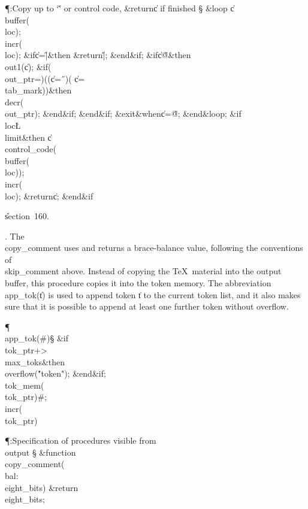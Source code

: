 \Y\P\?\4:Copy up to `\v' or control code, \?\&{return}\?\8\|c if finished%
\X\S\?\6
\1\&{loop}\6
\|c\?\K\?\\{buffer}\?\1(\?\\{loc}\?\2)\?;\5
\\{incr}\?\1(\?\\{loc}\?\2)\?;\6
\&{if}\1\1\8\|c\?=\?\H{|}\2\8\&{then}\6
\?\&{return}\?\8\H{|};\2\6
\&{end}\8\2\&{if}\1;\6
\&{if}\1\1\8\|c\?\I\?\H{@}\2\8\&{then}\6
\\{out1}\?\1(\?\|c\?\2)\?;\6
\&{if}\1\1\?\8\1(\?\\{out\_ptr}\?=\?\2)\W\1(\1(\?\|c\?=\?\H{\ }\?\2)\V\1(\?%
\|c\?=\?\\{tab\_mark}\?\2)\2)\?\2\8\&{then}\6
\\{decr}\?\1(\?\\{out\_ptr}\?\2)\?;\2\6
\&{end}\8\2\&{if}\1;\2\6
\&{end}\8\2\&{if}\1;\6
\?\&{exit}\8\&{when}\?\8\|c\?=\?\H{@};\2\6
\&{end}\8\&{loop};\6
\&{if}\1\1\8\\{loc}\?\L\?\\{limit}\2\8\&{then}\6
\|c\?\K\?\\{control\_code}\?\1(\?\\{buffer}\?\1(\?\\{loc}\?\2)\2)\?;\5
\\{incr}\?\1(\?\\{loc}\?\2)\?;\5
\?\&{return}\?\8\|c;\2\6
\&{end}\8\2\&{if}\1\par
\U section~160.\fi

. The \\{copy\_comment} uses and returns a brace-balance value, following
the
conventions of \\{skip\_comment} above. Instead of copying the \TeX\ material
into the output buffer, this procedure copies it into the token memory.
The abbreviation \\{app\_tok}\?(\?\|t\?)\? is used to append token \|t to the
current
token list, and it also makes sure that it is possible to append at least
one further token without overflow.

\Y\P\4\D\\{app\_tok}\?\1(\?\#\?\2)\S\?\6
\&{if}\1\1\8\\{tok\_ptr}\?+\?>\?\\{max\_toks}\2\8\&{then}\6
\\{overflow}\?\1(\?\.{"token"}\?\2)\?;\2\6
\&{end}\8\2\&{if}\1;\6
\\{tok\_mem}\?\1(\?\\{tok\_ptr}\?\2)\K\?\#;\5
\\{incr}\?\1(\?\\{tok\_ptr}\?\2)\?\par
\Y\P\?\4:Specification of procedures visible from \\{output}\X\mathrel{+}%
\S\?\6
\&{function}\8\1\\{copy\_comment}\?(\1\?\\{bal}\?:\?\\{eight\_bits}\?\2)%
\&{return}\?\8\\{eight\_bits}\2;\par
\fi


